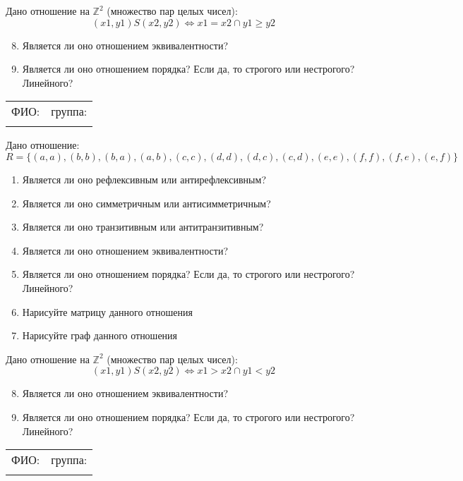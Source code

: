 \documentclass[russian,12pt]{article}
\begin{document}
Дано отношение на $\mathbb{Z}^2$ (множество пар целых чисел):
$$(x1, y1)S(x2, y2) \iff x1 = x2 \cap y1 \ge y2$$
\begin{enumerate}
\setcounter{enumi}{7}
\item Является ли оно отношением эквивалентности?
\item Является ли оно отношением порядка? Если да, то строгого или нестрогого? Линейного?
\end{enumerate}
\newpage
\thispagestyle{empty}
\begin{tabular}{|p{}|p{}|}
\hline
ФИО: & группа: \\
 & \\ \hline
\end{tabular}

\vspace{12pt}

Дано отношение:
$$R = \{(a, a), (b, b), (b, a), (a, b), (c, c), (d, d), (d, c), (c, d), (e, e), (f, f), (f, e), (e, f)\}$$
\begin{enumerate}
\item Является ли оно рефлексивным или антирефлексивным?
\item Является ли оно симметричным или антисимметричным?
\item Является ли оно транзитивным или антитранзитивным?
\item Является ли оно отношением эквивалентности?
\item Является ли оно отношением порядка? Если да, то строгого или нестрогого? Линейного?
\item Нарисуйте матрицу данного отношения
\item Нарисуйте граф данного отношения
\end{enumerate}

Дано отношение на $\mathbb{Z}^2$ (множество пар целых чисел):
$$(x1, y1)S(x2, y2) \iff x1 > x2 \cap y1 < y2$$
\begin{enumerate}
\setcounter{enumi}{7}
\item Является ли оно отношением эквивалентности?
\item Является ли оно отношением порядка? Если да, то строгого или нестрогого? Линейного?
\end{enumerate}
\newpage
\thispagestyle{empty}
\begin{tabular}{|p{}|p{}|}
\hline
ФИО: & группа: \\
 & \\ \hline
\end{tabular}
\end{document}
